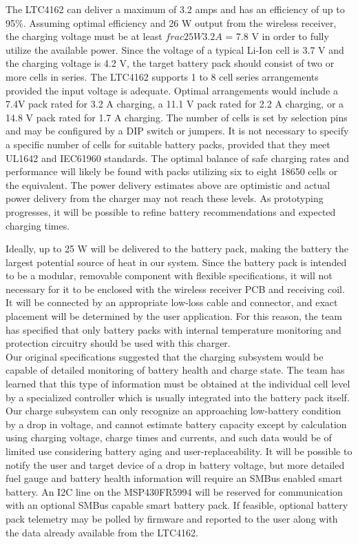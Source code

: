 \documentclass[12pt]{article}
\begin{document}
\indent
The LTC4162 can deliver a maximum of 3.2 amps and has an efficiency of up to 95\%. Assuming optimal efficiency and 26 W output from the wireless receiver, the charging voltage must be at least $frac{25 W}{3.2 A}$ = 7.8 V in order to fully utilize the available power. Since the voltage of a typical Li-Ion cell is 3.7 V and the charging voltage is 4.2 V, the target battery pack should consist of two or more cells in series. The LTC4162 supports 1 to 8 cell series arrangements provided the input voltage is adequate. Optimal arrangements would include a 7.4V pack rated for 3.2 A charging, a 11.1 V pack rated for 2.2 A charging, or a 14.8 V pack rated for 1.7 A charging. The number of cells is set by selection pins and may be configured by a DIP switch or jumpers. It is not necessary to specify a specific number of cells for suitable battery packs, provided that they meet UL1642 and IEC61960 standards. The optimal balance of safe charging rates and performance will likely be found with packs utilizing six to eight 18650 cells or the equivalent. The power delivery estimates above are optimistic and actual power delivery from the charger may not reach these levels. As prototyping progresses, it will be possible to refine battery recommendations and expected charging times.\\

\pagebreak

\indent
Ideally, up to 25 W will be delivered to the battery pack, making the battery the largest potential source of heat in our system. Since the battery pack is intended to be a modular, removable component with flexible specifications, it will not necessary for it to be enclosed with the wireless receiver PCB and receiving coil. It will be connected by an appropriate low-loss cable and connector, and exact placement will be determined by the user application. For this reason, the team has specified that only battery packs with internal temperature monitoring and protection circuitry should be used with this charger.\\

\indent
Our original specifications suggested that the charging subsystem would be capable of detailed monitoring of battery health and charge state. The team has learned that this type of information must be obtained at the individual cell level by a specialized controller which is usually integrated into the battery pack itself. Our charge subsystem can only recognize an approaching low-battery condition by a drop in voltage, and cannot estimate battery capacity except by calculation using charging voltage, charge times and currents, and such data would be of limited use considering battery aging and user-replaceability. It will be possible to notify the user and target device of a drop in battery voltage, but more detailed fuel gauge and battery health information will require an SMBus enabled smart battery. An I2C line on the MSP430FR5994 will be reserved for communication with an optional SMBus capable smart battery pack. If feasible, optional battery pack telemetry may be polled by firmware and reported to the user along with the data already available from the LTC4162.\\
\end{document}
